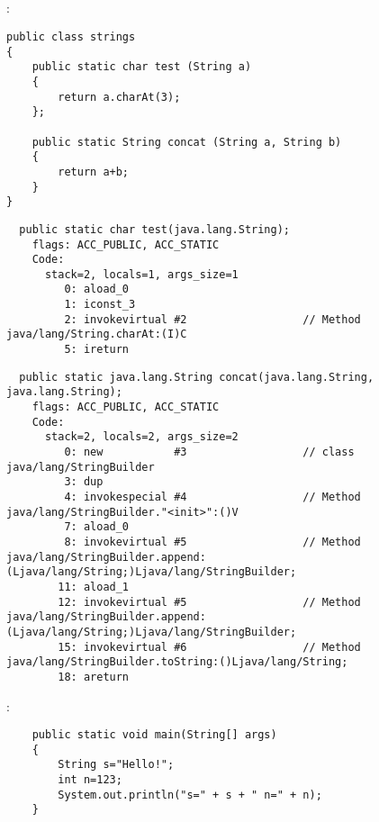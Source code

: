 \subsection{}

:

\begin{lstlisting}
public class strings
{
	public static char test (String a)
	{
		return a.charAt(3);
	};

	public static String concat (String a, String b)
	{
		return a+b;
	}
}
\end{lstlisting}

\begin{lstlisting}
  public static char test(java.lang.String);
    flags: ACC_PUBLIC, ACC_STATIC
    Code:
      stack=2, locals=1, args_size=1
         0: aload_0       
         1: iconst_3      
         2: invokevirtual #2                  // Method java/lang/String.charAt:(I)C
         5: ireturn       
\end{lstlisting}
         

\begin{lstlisting}
  public static java.lang.String concat(java.lang.String, java.lang.String);
    flags: ACC_PUBLIC, ACC_STATIC
    Code:
      stack=2, locals=2, args_size=2
         0: new           #3                  // class java/lang/StringBuilder
         3: dup           
         4: invokespecial #4                  // Method java/lang/StringBuilder."<init>":()V
         7: aload_0       
         8: invokevirtual #5                  // Method java/lang/StringBuilder.append:(Ljava/lang/String;)Ljava/lang/StringBuilder;
        11: aload_1       
        12: invokevirtual #5                  // Method java/lang/StringBuilder.append:(Ljava/lang/String;)Ljava/lang/StringBuilder;
        15: invokevirtual #6                  // Method java/lang/StringBuilder.toString:()Ljava/lang/String;
        18: areturn       
\end{lstlisting}

:

\begin{lstlisting}
	public static void main(String[] args)
	{
		String s="Hello!";
		int n=123;
		System.out.println("s=" + s + " n=" + n);
	}
\end{lstlisting}


